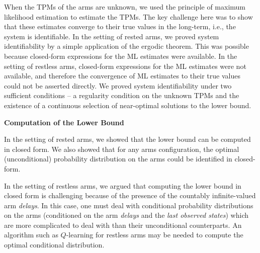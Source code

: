 When the TPMs of the arms are unknown, we used the principle of maximum likelihood estimation to estimate the TPMs. The key challenge here was to show that these estimates converge to their true values in the long-term, i.e., the system is identifiable. In the setting of rested arms, we proved system identifiability by a simple application of the ergodic theorem. This was possible because closed-form expressions for the ML estimates were available. In the setting of restless arms, closed-form expressions for the ML estimates were not available, and therefore the convergence of ML estimates to their true values could not be asserted directly. We proved system identifiability under two sufficient conditions -- a regularity condition on the unknown TPMs and the existence of a continuous selection of near-optimal solutions to the lower bound. 

\vspace{1cm}
\noindent \textbf{Computation of the Lower Bound}  

In the setting of rested arms, we showed that the lower bound can be computed in closed form. We also showed that for any arms configuration, the optimal (unconditional) probability distribution on the arms could be identified in closed-form. 


In the setting of restless arms, we argued that computing the lower bound in closed form is challenging because of the presence of the countably infinite-valued arm {\em delays}. In this case, one must deal with conditional probability distributions on the arms (conditioned on the arm {\em delays} and the {\em last observed states}) which are more complicated to deal with than their unconditional counterparts. An algorithm such as $Q$-learning for restless arms \cite{avrachenkov2020whittle} may be needed to compute the optimal conditional distribution. 
%


